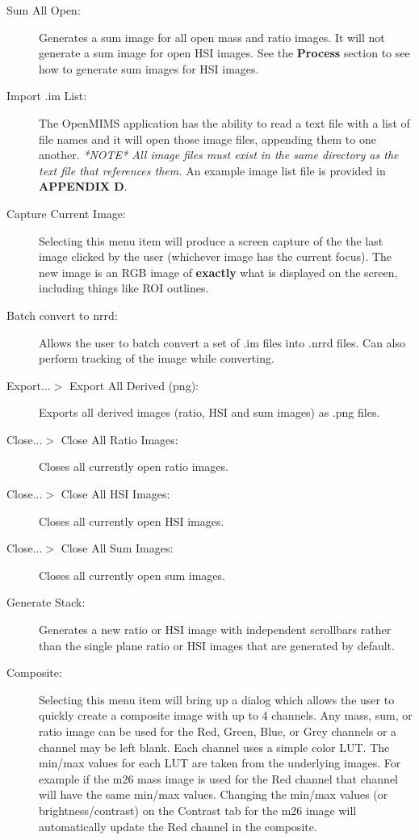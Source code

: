 \documentclass{article}
\begin{document}
\begin{description}
\begin{description}
	\item[Sum All Open:] Generates a sum image for all open mass and ratio images. It will not generate
	a sum image for open HSI images. See the \textbf{Process} section to see how
	to generate sum images for HSI images.
	
	\item[Import .im List:] The OpenMIMS application has the ability to read a text file with 
	a list of file names and it will open those image files, appending them to one another. \textit{*NOTE* All
	image files must exist in the same directory as the text file that references them.}
	An example image list file is provided in \textbf{APPENDIX D}.
	
	\item[Capture Current Image:] Selecting this menu item will produce a screen capture of the 
	the last image clicked by the user (whichever image has the current focus). 
	The new image is an RGB image of \textbf{exactly} what is displayed on the screen, 
	including things like ROI outlines.
	
	\item[Batch convert to nrrd:] Allows the user to batch convert a set of .im files into
	.nrrd files. Can also perform tracking of the image while converting.
	
	\item[Export...$>$ Export All Derived (png):] Exports all derived images (ratio, HSI and sum
	images) as .png files.
	
	\item[Close...$>$ Close All Ratio Images:] Closes all currently open ratio images.
	
	\item[Close...$>$ Close All HSI Images:] Closes all currently open HSI images.
	
	\item[Close...$>$ Close All Sum Images:] Closes all currently open sum images.
	
	\item[Generate Stack:] Generates a new ratio or HSI image with independent scrollbars 
	rather than the single plane ratio or HSI images that are generated by default.
	
	\item[Composite:] Selecting this menu item will bring up a dialog which allows the user to quickly create a composite image with up to 4 channels.  Any mass, sum, or ratio image can be used for the Red, Green, Blue, or Grey channels or a channel may be left blank.  Each channel uses a simple color LUT.  The min/max values for each LUT are taken from the underlying images.  For example if the m26 mass image is used for the Red channel that channel will have the same min/max values.  Changing the min/max values (or brightness/contrast) on the Contrast tab for the m26 image will automatically update the Red channel in the composite.
	

\end{description}
\end{description}
\end{document}
